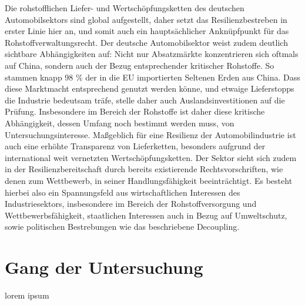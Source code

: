 \documentclass[12pt,a4paper,oneside]{book} %
\begin{document}
Die rohstofflichen Liefer- und Wertschöpfungsketten des deutschen Automobilsektors sind global aufgestellt, daher setzt das Resilienzbestreben in erster Linie hier an, und somit auch ein hauptsächlicher Anknüpfpunkt für das Rohstoffverwaltungsrecht. Der deutsche Automobilsektor weist zudem deutlich sichtbare Abhängigkeiten auf: Nicht nur Absatzmärkte konzentrieren sich oftmals auf China, sondern auch der Bezug entsprechender kritischer Rohstoffe. So stammen knapp 98 \% der in die EU importierten Seltenen Erden aus China.\autocite[4]{gaus_rare_2021} Dass diese Marktmacht entsprechend genutzt werden könne, und etwaige Lieferstopps die Industrie bedeutsam träfe, stelle daher auch Auslandsinvestitionen auf die Prüfung.\autocite[64]{becker_vom_2023} Insbesondere im Bereich der Rohstoffe ist daher diese kritische Abhängigkeit, dessen Umfang noch bestimmt werden muss, von Untersuchungsinteresse. Maßgeblich für eine Resilienz der Automobilindustrie ist auch eine erhöhte Transparenz von Lieferketten, besonders aufgrund der international weit vernetzten Wertschöpfungsketten.\autocite[9]{kagermann_resilienz_2021} Der Sektor sieht sich zudem in der Resilienzbereitschaft durch bereits existierende Rechtsvorschriften, wie denen zum Wettbewerb, in seiner Handlungsfähigkeit beeinträchtigt.\autocite[19]{kagermann_resilienz_2021} Es besteht hierbei also ein Spannungsfeld aus wirtschaftlichen Interessen des Industriesektors, insbesondere im Bereich der Rohstoffversorgung und Wettbewerbsfähigkeit, staatlichen Interessen auch in Bezug auf Umweltschutz, sowie politischen Bestrebungen wie das beschriebene Decoupling.

\section{Gang der Untersuchung}
lorem ipsum
\end{document}
